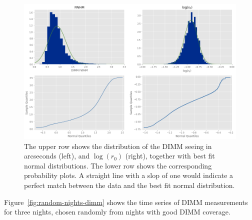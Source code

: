 \documentclass[DM,authoryear,toc]{lsstdoc}
\begin{document}
\begin{figure}
  \includegraphics[width=\columnwidth]{./figures/r0_dist.png}
  \caption{The upper row shows the distribution of the DIMM seeing in
    arcseconds (left), and $\log(r_0)$ (right), together with best fit
    normal distributions. The lower row shows the corresponding
    probability plots. A straight line with a slop of one would
    indicate a perfect match between the data and the best fit normal
    distribution.}
  \label{fig:r0-dist}
\end{figure}



Figure~\ref{fig:random-nights-dimm} shows the time series of DIMM
measurements for three nights, chosen randomly from nights with
good DIMM coverage. 
\end{document}
